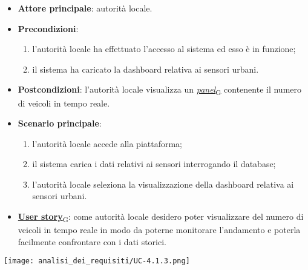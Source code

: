 \begin{itemize}
	\item \textbf{Attore principale}: autorità locale.
	\item \textbf{Precondizioni}:
	      \begin{enumerate}
		      \item l'autorità locale ha effettuato l'accesso al sistema ed esso è in funzione;
		      \item il sistema ha caricato la dashboard relativa ai sensori urbani.
	      \end{enumerate}
	\item \textbf{Postcondizioni}: l'autorità locale visualizza un \href{https://7last.github.io/docs/pb/documentazione-interna/glossario\#panel}{\textit{panel}\textsubscript{G}} contenente il numero di veicoli in tempo reale.
	\item \textbf{Scenario principale}:
	      \begin{enumerate}
		      \item l'autorità locale accede alla piattaforma;
		      \item il sistema carica i dati relativi ai sensori interrogando il database;
		      \item l'autorità locale seleziona la visualizzazione della dashboard relativa ai sensori urbani.
	      \end{enumerate}
	\item \href{https://7last.github.io/docs/pb/documentazione-interna/glossario\#user-story}{\textbf{User story}\textsubscript{G}}:
	      come autorità locale desidero poter visualizzare del numero di veicoli in tempo reale in modo da poterne monitorare l'andamento
	      e poterla facilmente confrontare con i dati storici.
\end{itemize}
\begin{center}
	\texttt{[image: analisi\_dei\_requisiti/UC-4.1.3.png]}
\end{center}


